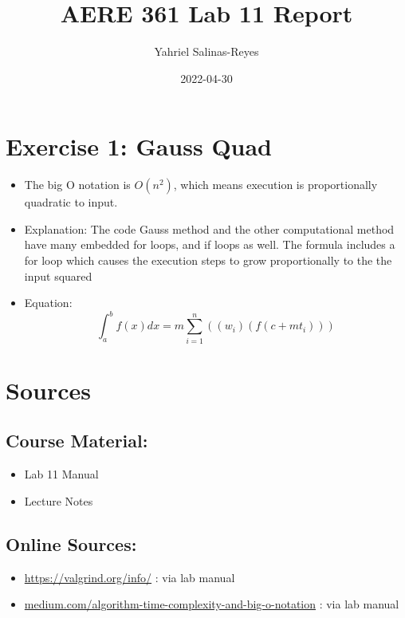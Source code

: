 \documentclass{article}
\title{AERE 361 Lab 11 Report}
\author{Yahriel Salinas-Reyes}
\date{2022-04-30}
\begin{document}
\maketitle

\newpage



\section{Exercise 1: Gauss Quad}
\begin{itemize}
    \item{The big O notation is $O(n^2)$, which means  execution is proportionally quadratic to input.}
    \item{Explanation: The code Gauss method and the other computational method have many embedded for loops, and if loops as well. The formula includes a for loop which causes the execution steps to grow proportionally to the the input squared}
    \item{Equation: $$\int_{a}^{b}f(x)dx = m\sum_{i=1}^{n}((w_i)(f(c+mt_i)))$$}
\end{itemize}

\newpage

\section{Sources}

\subsection{Course Material:}
\begin{itemize}
    \item{Lab 11 Manual}
    \item{Lecture Notes}
\end{itemize}

\subsection{Online Sources:}
\begin{itemize}
    \item{\url{https://valgrind.org/info/} : via lab manual}
    \item{\url{medium.com/algorithm-time-complexity-and-big-o-notation} : via lab manual}
\end{itemize}
\end{document}
